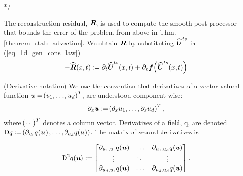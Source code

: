 \documentclass[final]{amsart}
\newcommand{\recgs}[1]{\widehat{\vec{#1}}}
\renewcommand{\vect}[1]{\geovec{#1}}
\renewcommand{\vec}[1]{\geovec{#1}}
\numberwithin{equation}{section}
\begin{document}
*/
\begin{Rem}\label{Rem_reconstruction_residual_eq_adv}
  The reconstruction residual, $\vect{R}$, is used to compute the smooth post-processor that bounds the error of the problem from above in Thm. \ref{theorem_stab_advection}.  We obtain $\vect{R}$ by substituting $\recgs{U}^{ts}$ in (\ref{eq_1d_gen_cons_law}):
	\begin{equation}\label{eq_reconstruction_gen_cons}
	-\recgs{R}\qp{ x,t}:=\partial_t\widehat{\vect U}^{ts}\qp{ {x},t}+\partial_x \vect{f}\qp{\recgs{U}^{ts}\qp{x,t}}
	\end{equation}
\end{Rem}

\begin{Rem}(Derivative notation)
We use the convention that derivatives of a vector-valued function $\vect{u}=\qp{u_1, \dots, u_d}^T$, are understood component-wise:
\begin{equation}
\partial_x \vect{u} := \qp{\partial_x u_1,\dots,\partial_x u_d}^T,
\end{equation}
where $\!\left({\cdots}\right)^T$ denotes a column vector.
Derivatives of a field, q, are denoted $\D q:=\qp{\partial_{u_1}q\qp{\vect{u}},\dots, \partial_{u_d}q\qp{\vect{u}}}$.  The matrix of second derivatives is 

\begin{equation}
	\D^2q\qp{\vec{u}}:=\begin{bmatrix}
\partial_{{u_1,}{u_1}}{q\qp{\vec{u}}}&\dotsc&\partial_{{u_1,}{u_d}}{q\qp{\vec{u}}}
\\
\vdots & \ddots &\vdots
\\
\partial_{{u_d,}{u_1}}{q\qp{\vec{u}}}&\dotsc&\partial_{{u_d,}{u_d}}{q\qp{\vec{u}}}
\end{bmatrix}.
\end{equation}
\end{Rem}
\end{document}
